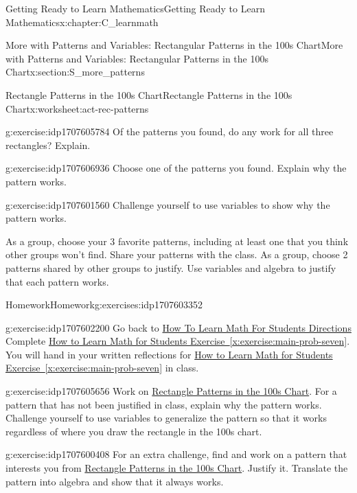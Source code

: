 \documentclass[oneside,10pt,]{book}
\newcommand{\xreffont}{\relax}
\numberwithin{equation}{chapter}
\begin{document}
\begin{chapterptx}{Getting Ready to Learn Mathematics}{}{Getting Ready to Learn Mathematics}{}{}{x:chapter:C_learnmath}
\begin{sectionptx}{More with Patterns and Variables: Rectangular Patterns in the 100s Chart}{}{More with Patterns and Variables: Rectangular Patterns in the 100s Chart}{}{}{x:section:S_more_patterns}
\begin{worksheet-subsection}{Rectangle Patterns in the 100s Chart}{}{Rectangle Patterns in the 100s Chart}{}{}{x:worksheet:act-rec-patterns}
\begin{divisionexercise}{4}{}{}{g:exercise:idp1707605784}
Of the patterns you found, do any work for all three rectangles? Explain.%
\end{divisionexercise}%
\begin{divisionexercise}{5}{}{}{g:exercise:idp1707606936}%
Choose one of the patterns you found. Explain why the pattern works.%
\end{divisionexercise}%
\begin{divisionexercise}{6}{}{}{g:exercise:idp1707601560}%
Challenge yourself to use variables to show why the pattern works.%
\end{divisionexercise}%
\begin{conclusion}{}%
As a group, choose your 3 favorite patterns, including at least one that you think other groups won't find. Share your patterns with the class. As a group, choose 2 patterns shared by other groups to justify. Use variables and algebra to justify that each pattern works.%
\end{conclusion}%
\end{worksheet-subsection}
\restoregeometry
%
%
\typeout{************************************************}
\typeout{************************************************}
%
\begin{exercises-subsection}{Homework}{}{Homework}{}{}{g:exercises:idp1707603352}
\begin{divisionexercise}{1}{}{}{g:exercise:idp1707602200}%
Go back to \hyperlink{x:paragraphs:htlmfs-directions}{How To Learn Math For Students Directions} Complete \hyperref[x:exercise:main-prob-seven]{How to Learn Math for Students Exercise~{\xreffont\ref{x:exercise:main-prob-seven}}}. You will hand in your written reflections for \hyperref[x:exercise:main-prob-seven]{How to Learn Math for Students Exercise~{\xreffont\ref{x:exercise:main-prob-seven}}} in class.%
\end{divisionexercise}%
\begin{divisionexercise}{2}{}{}{g:exercise:idp1707605656}%
Work on \hyperref[x:worksheet:act-rec-patterns]{Rectangle Patterns in the 100s Chart}. For a pattern that has not been justified in class, explain why the pattern works. Challenge yourself to use variables to generalize the pattern so that it works regardless of where you draw the rectangle in the 100s chart.%
\end{divisionexercise}%
\begin{divisionexercise}{3}{}{}{g:exercise:idp1707600408}%
For an extra challenge, find and work on a pattern that interests you from \hyperref[x:worksheet:act-rec-patterns]{Rectangle Patterns in the 100s Chart}. Justify it. Translate the pattern into algebra and show that it always works.%

\end{divisionexercise}
\end{exercises-subsection}
\end{sectionptx}
\end{chapterptx}
\end{document}
